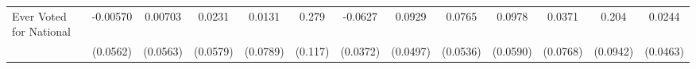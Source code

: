 {\begin{tabular}{l*{12}{c}}
\addlinespace
Ever Voted for National&    -0.00570         &     0.00703         &      0.0231         &      0.0131         &       0.279\sym{*}  &     -0.0627         &      0.0929         &      0.0765         &      0.0978         &      0.0371         &       0.204\sym{*}  &      0.0244         \\
            &    (0.0562)         &    (0.0563)         &    (0.0579)         &    (0.0789)         &     (0.117)         &    (0.0372)         &    (0.0497)         &    (0.0536)         &    (0.0590)         &    (0.0768)         &    (0.0942)         &    (0.0463)         \\
\bottomrule
\end{tabular}
}

